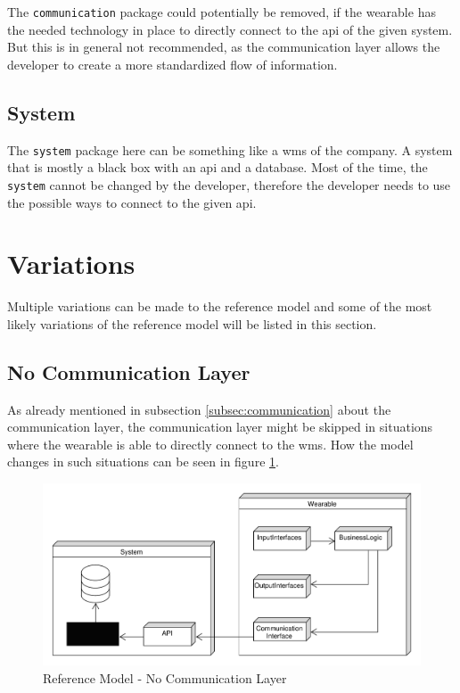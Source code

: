 The \texttt{communication} package could potentially be removed, if the wearable has the needed technology in place to directly connect to the \gls{api} of the given system. But this is in general not recommended, as the communication layer allows the developer to create a more standardized flow of information.

\subsection{System}
The \texttt{system} package here can be something like a \gls{wms} of the company. A system that is mostly a black box with an \gls{api} and a database. Most of the time, the \texttt{system} cannot be changed by the developer, therefore the developer needs to use the possible ways to connect to the given \gls{api}.

\section{Variations}
Multiple variations can be made to the reference model and some of the most likely variations of the reference model will be listed in this section.

\subsection{No Communication Layer}
As already mentioned in subsection \ref{subsec:communication} about the communication layer, the communication layer might be skipped in situations where the wearable is able to directly connect to the \gls{wms}. How the model changes in such situations can be seen in figure \ref{fig:referenceModel_NoCommunication}. 

\begin{figure}[htbp]
	\begin{center}	
	\includegraphics[width=\linewidth]{images/PackageModel_ReferenceArchitecture_NoCommunication}	
	\end{center}
	\caption{Reference Model - No Communication Layer}
	\label{fig:referenceModel_NoCommunication}
\end{figure}

